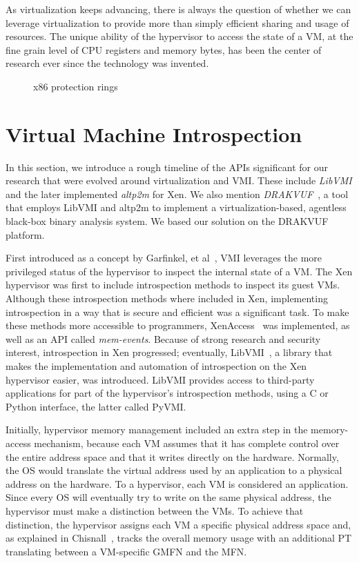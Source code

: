 As virtualization keeps advancing, there is always the question of whether we can leverage virtualization to provide more than simply efficient sharing and usage of resources. The unique ability of the hypervisor to access the state of a \ac{VM}, at the fine grain level of \ac{CPU} registers and memory bytes, has been the center of research ever since the technology was invented. 

\begin{figure}
	\centering
	
	\caption{x86 protection rings}
	\label{fig:rings}
\end{figure}

\section{Virtual Machine Introspection}\label{sec:vmi}
In this section, we introduce a rough timeline of the \acp{API} significant for our research that were evolved around virtualization and \ac{VMI}. These include \emph{LibVMI} and the later implemented \emph{altp2m} for Xen. We also mention \emph{DRAKVUF}~\cite{lengyel2014drakvuf}, a tool that employs LibVMI and altp2m to implement a virtualization-based, agentless black-box binary analysis system. We based our solution on the DRAKVUF platform. 	

\par First introduced as a concept by Garfinkel, et al~\cite{garfinkel2003virtual}, \ac{VMI} leverages the more privileged status of the hypervisor to inspect the internal state of a \ac{VM}. The Xen hypervisor was first to include introspection methods to inspect its guest \ac{VM}s. Although these introspection methods where included in Xen, implementing introspection in a way that is secure and efficient was a significant task. To make these methods more accessible to programmers, XenAccess~\cite{payne2007secure} was implemented, as well as an \ac{API} called \emph{mem-events}. Because of strong research and security interest, introspection in Xen progressed; eventually, LibVMI~\cite{payne2011libvmi}, a library that makes the implementation and automation of introspection on the Xen hypervisor easier, was introduced. LibVMI provides access to third-party applications for part of the hypervisor's introspection methods, using a C or Python interface, the latter called PyVMI. 

\par Initially, hypervisor memory management included an extra step in the memory-access mechanism, because each \ac{VM} assumes that it has complete control over the entire address space and that it writes directly on the hardware. Normally, the \ac{OS} would translate the virtual address used by an application to a physical address on the hardware. To a hypervisor, each \ac{VM} is considered an application. Since every \ac{OS} will eventually try to write on the same physical address, the hypervisor must make a distinction between the \ac{VM}s. To achieve that distinction, the hypervisor assigns each \ac{VM} a specific physical address space and, as explained in Chisnall~\cite{chisnall2008definitive}, tracks the overall memory usage with an additional \ac{PT} translating between a \ac{VM}-specific \ac{GMFN} and the \ac{MFN}.


